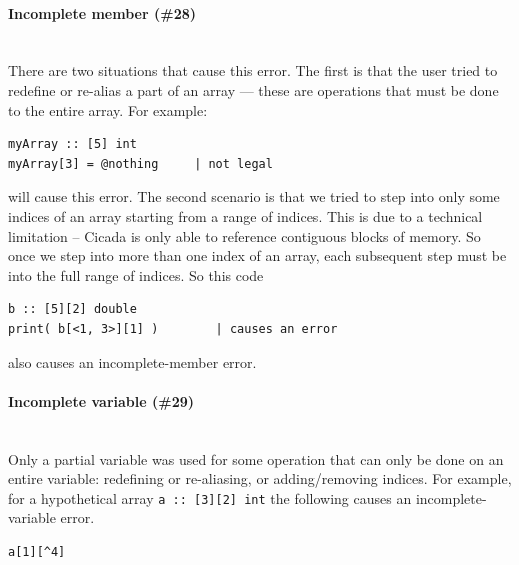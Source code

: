 \documentclass{article}
\newenvironment{code}{
       \begin{list}{}{
               \setlength{\leftmargin}{.4in}
               \setlength{\rightmargin}{0in}
               \setlength{\topsep}{.2in}
       }
       \small
       \item[] }
       { \end{list}   }
\begin{document}
\paragraph{Incomplete member (\#28)\\\\}

There are two situations that cause this error.  The first is that the user tried to redefine or re-alias a part of an array --- these are operations that must be done to the entire array.  For example:

\begin{code} \begin{verbatim}
myArray :: [5] int
myArray[3] = @nothing     | not legal
\end{verbatim} \end{code}

\noindent will cause this error.  The second scenario is that we tried to step into only some indices of an array starting from a range of indices.  This is due to a technical limitation -- Cicada is only able to reference contiguous blocks of memory.  So once we step into more than one index of an array, each subsequent step must be into the full range of indices.  So this code

\begin{code} \begin{verbatim}
b :: [5][2] double
print( b[<1, 3>][1] )        | causes an error
\end{verbatim} \end{code}

\noindent also causes an incomplete-member error.\\




\paragraph{Incomplete variable (\#29)\\\\}

Only a partial variable was used for some operation that can only be done on an entire variable:  redefining or re-aliasing, or adding/removing indices.  For example, for a hypothetical array \verb#a :: [3][2] int# the following causes an incomplete-variable error.

\begin{code} \begin{verbatim}
a[1][^4]
\end{verbatim} \end{code}
\end{document}
